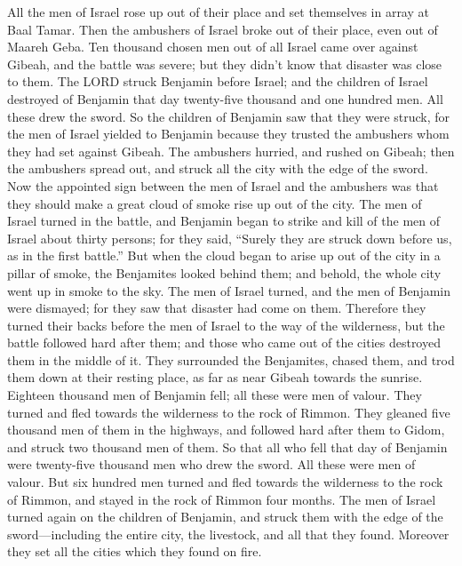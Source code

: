  All the men of Israel rose up out of their place and set
themselves in array at Baal Tamar. Then the ambushers of Israel broke
out of their place, even out of Maareh Geba.  Ten
thousand chosen men out of all Israel came over against Gibeah, and the
battle was severe; but they didn't know that disaster was close to them.
 The LORD struck Benjamin before Israel; and the children
of Israel destroyed of Benjamin that day twenty-five thousand and one
hundred men. All these drew the sword.  So the children
of Benjamin saw that they were struck, for the men of Israel yielded to
Benjamin because they trusted the ambushers whom they had set against
Gibeah.  The ambushers hurried, and rushed on Gibeah;
then the ambushers spread out, and struck all the city with the edge of
the sword.  Now the appointed sign between the men of
Israel and the ambushers was that they should make a great cloud of
smoke rise up out of the city.  The men of Israel turned
in the battle, and Benjamin began to strike and kill of the men of
Israel about thirty persons; for they said, ``Surely they are struck
down before us, as in the first battle.''  But when the
cloud began to arise up out of the city in a pillar of smoke, the
Benjamites looked behind them; and behold, the whole city went up in
smoke to the sky.  The men of Israel turned, and the men
of Benjamin were dismayed; for they saw that disaster had come on them.
 Therefore they turned their backs before the men of
Israel to the way of the wilderness, but the battle followed hard after
them; and those who came out of the cities destroyed them in the middle
of it.  They surrounded the Benjamites, chased them, and
trod them down at their resting place, as far as near Gibeah towards the
sunrise.  Eighteen thousand men of Benjamin fell; all
these were men of valour.  They turned and fled towards
the wilderness to the rock of Rimmon. They gleaned five thousand men of
them in the highways, and followed hard after them to Gidom, and struck
two thousand men of them.  So that all who fell that day
of Benjamin were twenty-five thousand men who drew the sword. All these
were men of valour.  But six hundred men turned and fled
towards the wilderness to the rock of Rimmon, and stayed in the rock of
Rimmon four months.  The men of Israel turned again on
the children of Benjamin, and struck them with the edge of the
sword---including the entire city, the livestock, and all that they
found. Moreover they set all the cities which they found on fire.

